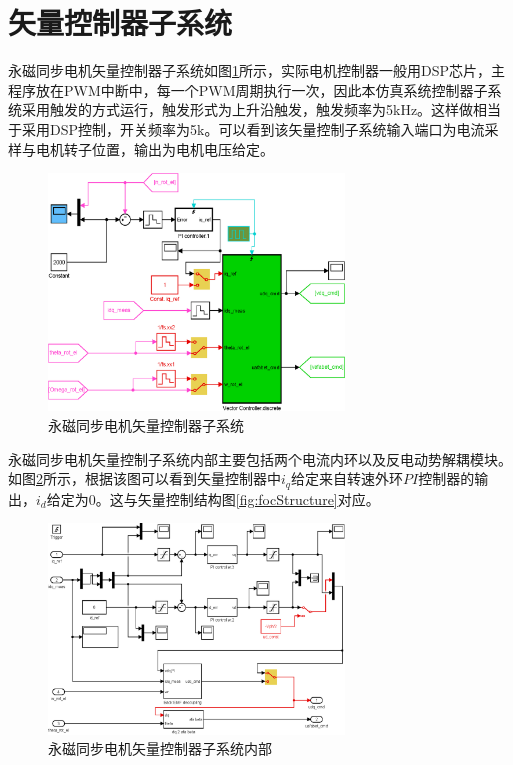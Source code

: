 \section{矢量控制器子系统}
永磁同步电机矢量控制器子系统如图\ref{fig:controller_subsystem}所示，实际电机控制器一般用DSP芯片，主程序放在PWM中断中，每一个PWM周期执行一次，因此本仿真系统控制器子系统采用触发的方式运行，触发形式为上升沿触发，触发频率为5kHz。这样做相当于采用DSP控制，开关频率为5k。可以看到该矢量控制子系统输入端口为电流采样与电机转子位置，输出为电机电压给定。
\begin{figure}[H]
	\centering
	\includegraphics[width=0.7\textwidth]{figs/controller_subsystem.eps}
	\caption{永磁同步电机矢量控制器子系统}
	\label{fig:controller_subsystem}
\end{figure}
永磁同步电机矢量控制子系统内部主要包括两个电流内环以及反电动势解耦模块。如图\ref{fig:controller_inside}所示，根据该图可以看到矢量控制器中$i_{q}$给定来自转速外环$PI$控制器的输出，$i_{d}$给定为0。这与矢量控制结构图\ref{fig:focStructure}对应。
\begin{figure}[H]
	\centering
	\includegraphics[width=0.7\textwidth]{figs/controller_inside.eps}
	\caption{永磁同步电机矢量控制器子系统内部}
	\label{fig:controller_inside}
\end{figure}
